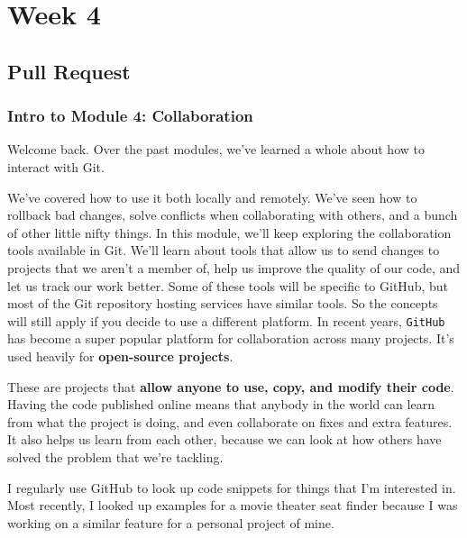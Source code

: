 %
%
%
\chapter{Week 4}

\section{Pull Request}

	\subsection{Intro to Module 4: Collaboration}
	
	Welcome back. Over the past modules, we've learned a whole about how to interact with Git.
	
	We've covered how to use it both locally and remotely. We've seen how to rollback bad changes, solve conflicts when collaborating with others, and a bunch of other little nifty things. In this module, we'll keep exploring the collaboration tools available in Git. We'll learn about tools that allow us to send changes to projects that we aren't a member of, help us improve the quality of our code, and let us track our work better. Some of these tools will be specific to GitHub, but most of the Git repository hosting services have similar tools. So the concepts will still apply if you decide to use a different platform. In recent years, \texttt{GitHub} has become a super popular platform for collaboration across many projects. It's used heavily for \textbf{open-source projects}.
	
	These are projects that \textbf{allow anyone to use, copy, and modify their code}. Having the code published online means that anybody in the world can learn from what the project is doing, and even collaborate on fixes and extra features. It also helps us learn from each other, because we can look at how others have solved the problem that we're tackling. 
	
	I regularly use GitHub to look up code snippets for things that I'm interested in. Most recently, I looked up examples for a movie theater seat finder because I was working on a similar feature for a personal project of mine.
	
